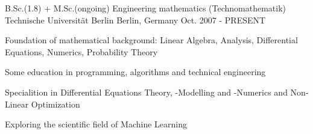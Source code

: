 


\begin{cventries}


\cventry
{B.Sc.(1.8) + M.Sc.(ongoing) Engineering mathematics (Technomathematik)} %
{Technische Universität Berlin} %
{Berlin, Germany} %
{Oct. 2007 - PRESENT} %
{ %
\begin{cvitems}
\item {Foundation of mathematical background: Linear Algebra, Analysis, Differential Equations, Numerics, Probability Theory}
\item {Some education in programming, algorithms and technical engineering}
\item {Specialition in Differential Equations Theory, -Modelling and -Numerics and Non-Linear Optimization}
\item{Exploring the scientific field of Machine Learning}
\end{cvitems}
}


\end{cventries}